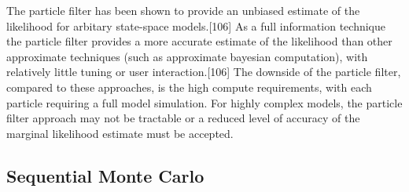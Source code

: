 \documentclass[11pt,twoside]{bristolthesis}
\begin{document}
  The particle filter has been shown to provide an unbiased estimate of the likelihood for arbitary state-space models.{[}106{]} As a full information technique the particle filter provides a more accurate estimate of the likelihood than other approximate techniques (such as approximate bayesian computation), with relatively little tuning or user interaction.{[}106{]} The downside of the particle filter, compared to these approaches, is the high compute requirements, with each particle requiring a full model simulation. For highly complex models, the particle filter approach may not be tractable or a reduced level of accuracy of the marginal likelihood estimate must be accepted.
  
  \hypertarget{sequential-monte-carlo}{%
  \subsection{Sequential Monte Carlo}\label{sequential-monte-carlo}}
  
\end{document}
